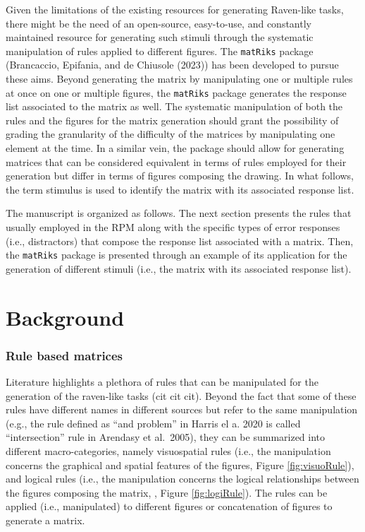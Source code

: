 Given the limitations of the existing resources for generating Raven-like tasks, there might be the need of an open-source, easy-to-use, and constantly maintained resource for generating such stimuli through the systematic manipulation of rules applied to different figures.
The \texttt{matRiks} package (Brancaccio, Epifania, and de Chiusole (2023)) has been developed to pursue these aims.
Beyond generating the matrix by manipulating one or multiple rules at once on one or multiple figures, the \texttt{matRiks} package generates the response list associated to the matrix as well.
The systematic manipulation of both the rules and the figures for the matrix generation should grant the possibility of grading the granularity of the difficulty of the matrices by manipulating one element at the time.
In a similar vein, the package should allow for generating matrices that can be considered equivalent in terms of rules employed for their generation but differ in terms of figures composing the drawing. In what follows, the term stimulus is used to identify the matrix with its associated response list.

The manuscript is organized as follows.
The next section presents the rules that usually employed in the RPM along with the specific types of error responses (i.e., distractors) that compose the response list associated with a matrix. Then, the \texttt{matRiks} package is presented through an example of its application for the generation of different stimuli (i.e., the matrix with its associated response list).

\hypertarget{background}{%
\section{Background}\label{background}}

\hypertarget{rule-based-matrices}{%
\subsubsection{Rule based matrices}\label{rule-based-matrices}}

Literature highlights a plethora of rules that can be manipulated for the generation of the raven-like tasks (cit cit cit).
Beyond the fact that some of these rules have different names in different sources but refer to the same manipulation (e.g., the rule defined as ``and problem'' in Harris el a. 2020 is called ``intersection'' rule in Arendasy et al.~2005), they can be summarized into different macro-categories, namely visuospatial rules (i.e., the manipulation concerns the graphical and spatial features of the figures, Figure \ref{fig:visuoRule}), and logical rules (i.e., the manipulation concerns the logical relationships between the figures composing the matrix, , Figure \ref{fig:logiRule}). The rules can be applied (i.e., manipulated) to different figures or concatenation of figures to generate a matrix.

